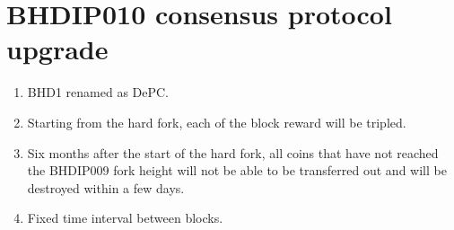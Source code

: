 \chapter{BHDIP010 consensus protocol upgrade}
\begin{flushleft}
   \begin{enumerate}
       \item BHD1 renamed as DePC.
       \item Starting from the hard fork, each of the block reward will be tripled.
       \item Six months after the start of the hard fork, all coins that have not reached the BHDIP009 fork height will not be able to be transferred out and will be destroyed within a few days.
       \item Fixed time interval between blocks.
   \end{enumerate}
\end{flushleft}
